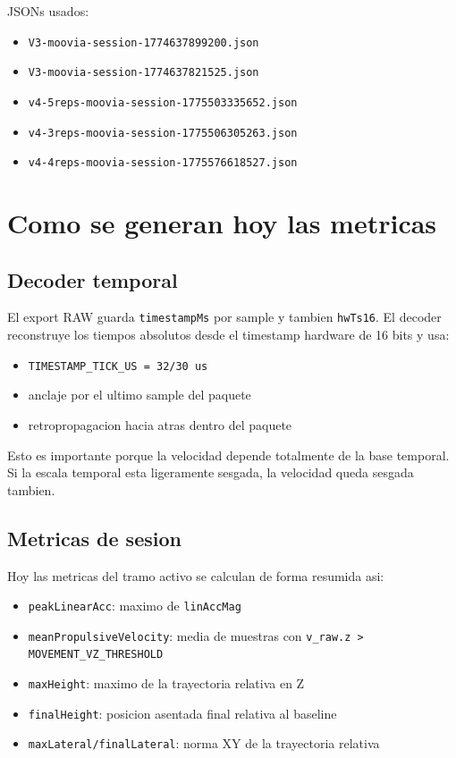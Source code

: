 \documentclass[11pt,a4paper]{article}
\begin{document}
JSONs usados:
\begin{itemize}[leftmargin=14pt]
  \item \texttt{V3-moovia-session-1774637899200.json}
  \item \texttt{V3-moovia-session-1774637821525.json}
  \item \texttt{v4-5reps-moovia-session-1775503335652.json}
  \item \texttt{v4-3reps-moovia-session-1775506305263.json}
  \item \texttt{v4-4reps-moovia-session-1775576618527.json}
\end{itemize}

\section{Como se generan hoy las metricas}
\subsection*{Decoder temporal}
El export RAW guarda \texttt{timestampMs} por sample y tambien \texttt{hwTs16}. El decoder reconstruye los tiempos absolutos desde el timestamp hardware de 16 bits y usa:
\begin{itemize}[leftmargin=14pt]
  \item \texttt{TIMESTAMP\_TICK\_US = 32/30 us}
  \item anclaje por el ultimo sample del paquete
  \item retropropagacion hacia atras dentro del paquete
\end{itemize}

Esto es importante porque la velocidad depende totalmente de la base temporal. Si la escala temporal esta ligeramente sesgada, la velocidad queda sesgada tambien.

\subsection*{Metricas de sesion}
Hoy las metricas del tramo activo se calculan de forma resumida asi:
\begin{itemize}[leftmargin=14pt]
  \item \texttt{peakLinearAcc}: maximo de \texttt{linAccMag}
  \item \texttt{meanPropulsiveVelocity}: media de muestras con \texttt{v\_raw.z > MOVEMENT\_VZ\_THRESHOLD}
  \item \texttt{maxHeight}: maximo de la trayectoria relativa en Z
  \item \texttt{finalHeight}: posicion asentada final relativa al baseline
  \item \texttt{maxLateral/finalLateral}: norma XY de la trayectoria relativa
\end{itemize}
\end{document}
